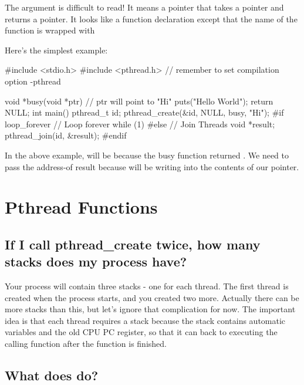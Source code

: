 The argument  is difficult to read! It means a pointer that takes a  pointer and returns a  pointer. It looks like a function declaration except that the name of the function is wrapped with 

Here's the simplest example:

\begin{code}[language=C]
#include <stdio.h>
#include <pthread.h>
// remember to set compilation option -pthread

void *busy(void *ptr) {
// ptr will point to "Hi"
    puts("Hello World");
    return NULL;
}
int main() {
    pthread_t id;
    pthread_create(&id, NULL, busy, "Hi");
#if loop_forever // Loop forever
    while (1) {}
#else // Join Threads
    void *result;
    pthread_join(id, &result);
#endif
}
\end{code}

In the above example,  will be  because the busy function returned . We need to pass the address-of result because  will be writing into the contents of our pointer.

\section{Pthread Functions}\label{more-pthread-functions}

\subsection{If I call pthread\_create twice, how many stacks does my process have?}\label{if-i-call-pthreadux5fcreate-twice-how-many-stacks-does-my-process-have}

Your process will contain three stacks - one for each thread. The first thread is created when the process starts, and you created two more. Actually there can be more stacks than this, but let's ignore that complication for now. The important idea is that each thread requires a stack because the stack contains automatic variables and the old CPU PC register, so that it can back to executing the calling function after the function is finished.

\subsection{\texorpdfstring{What does  do?}{What does pthread\_cancel do?}}\label{what-does-pthreadux5fcancel-do}

